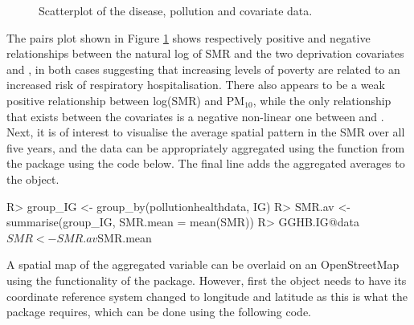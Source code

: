 \documentclass[article, nojss]{jss}
\begin{document}
\begin{figure}
\centering 
{}
\caption{Scatterplot of the disease, pollution and covariate data.\label{pollution_scatterplot}}
\end{figure} 


The pairs plot shown in Figure \ref{pollution_scatterplot} shows respectively positive and negative relationships between the natural log of SMR and the two deprivation covariates  and , in both cases suggesting that increasing levels of poverty are related to an increased risk of respiratory hospitalisation. There also appears to be a weak positive relationship between log(SMR) and PM$_{10}$, while the only relationship that exists between the covariates  is a negative non-linear one between  and . Next, it is of interest to visualise the average spatial pattern in the SMR over all five years, and the data can be appropriately aggregated using the  function from the  package using the code below. The final line adds the aggregated averages to the   object.


\begin{Schunk}
\begin{Sinput}
R>  group_IG <- group_by(pollutionhealthdata, IG)
R>  SMR.av <- summarise(group_IG, SMR.mean = mean(SMR))
R>  GGHB.IG@data$SMR <- SMR.av$SMR.mean
\end{Sinput}
\end{Schunk}

A spatial map of the aggregated  variable can be overlaid on an OpenStreetMap using the functionality of the  package. However, first the  object needs to have its coordinate reference system changed to longitude and latitude as this is what the  package requires, which can be done using the following  code.
\end{document}
